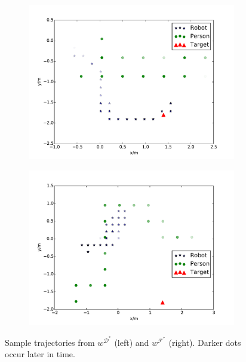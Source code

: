 \documentclass{aamas2016}
\begin{document}
\begin{figure}[t]
  \hspace{-15pt}
  \begin{subfigure}{0.22\textwidth}
    \includegraphics[scale = 0.24]{images/gp.pdf}
    \label{fig:good_path}
  \end{subfigure}
  \hspace{10pt}
  \begin{subfigure}{0.22\textwidth}
    \includegraphics[scale = 0.24]{images/bp.pdf}
    \label{fig:bad_path}
\end{subfigure}
  \caption{\small{Sample trajectories from $w^{\mathcal{D}^*}$ (left) and $w^{\mathcal{F}^*}$ (right). Darker dots occur later in time.}} %
  \label{fig:paths}
\end{figure}
\end{document}
